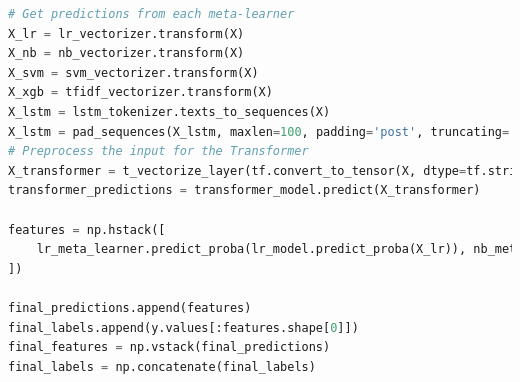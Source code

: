 \begin{tcolorbox}[colback=gray!5!white, colframe=gray!80!black, boxrule=0.5pt, title=Hierarchical Ensemble Model 2] 
    \begin{lstlisting}[language=Python]
# Get predictions from each meta-learner
X_lr = lr_vectorizer.transform(X)
X_nb = nb_vectorizer.transform(X)
X_svm = svm_vectorizer.transform(X)
X_xgb = tfidf_vectorizer.transform(X)
X_lstm = lstm_tokenizer.texts_to_sequences(X)
X_lstm = pad_sequences(X_lstm, maxlen=100, padding='post', truncating='post')
# Preprocess the input for the Transformer
X_transformer = t_vectorize_layer(tf.convert_to_tensor(X, dtype=tf.string))  # Use the text vectorizer layer
transformer_predictions = transformer_model.predict(X_transformer)

features = np.hstack([
    lr_meta_learner.predict_proba(lr_model.predict_proba(X_lr)), nb_meta_learner.predict_proba(nb_model.predict_proba(X_nb)), svm_meta_learner.predict_proba(svm_model.predict_proba(X_svm)), xgb_meta_learner.predict_proba(xgb_model.predict_proba(X_xgb)), lstm_meta_learner.predict_proba(lstm_model.predict(X_lstm)), transformer_meta_learner.predict_proba(transformer_predictions)
])

final_predictions.append(features)
final_labels.append(y.values[:features.shape[0]])
final_features = np.vstack(final_predictions)
final_labels = np.concatenate(final_labels)
    \end{lstlisting}
\end{tcolorbox}

\noindent


\pagebreak

